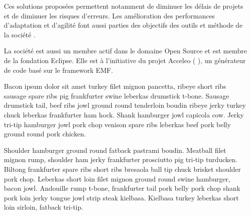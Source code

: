 Ces solutions proposées permettent notamment de diminuer les délais de projets et de diminuer les risques d'erreurs. Les amélioration des performances d'adaptation et d'agilité font aussi parties des objectifs des outils et méthode de la société \kwobeo{}.

La société \kwobeo{} est aussi un membre actif dans le domaine Open Source et est membre de la fondation Eclipse. Elle est à l'initiative du projet Acceleo (\cf{} \cite{acceleo}), un générateur de code basé sur le framework EMF. 

Bacon ipsum dolor sit amet turkey filet mignon pancetta, ribeye short ribs sausage spare ribs pig frankfurter swine leberkas drumstick t-bone. Sausage drumstick tail, beef ribs jowl ground round tenderloin boudin ribeye jerky turkey chuck leberkas frankfurter ham hock. Shank hamburger jowl capicola cow. Jerky tri-tip hamburger jowl pork chop venison spare ribs leberkas beef pork belly ground round pork chicken.

Shoulder hamburger ground round fatback pastrami boudin. Meatball filet mignon rump, shoulder ham jerky frankfurter prosciutto pig tri-tip turducken. Biltong frankfurter spare ribs short ribs bresaola ball tip chuck brisket shoulder pork chop. Leberkas short loin filet mignon ground round swine hamburger, bacon jowl. Andouille rump t-bone, frankfurter tail pork belly pork chop shank pork loin jerky tongue jowl strip steak kielbasa. Kielbasa turkey leberkas short loin sirloin, fatback tri-tip.


